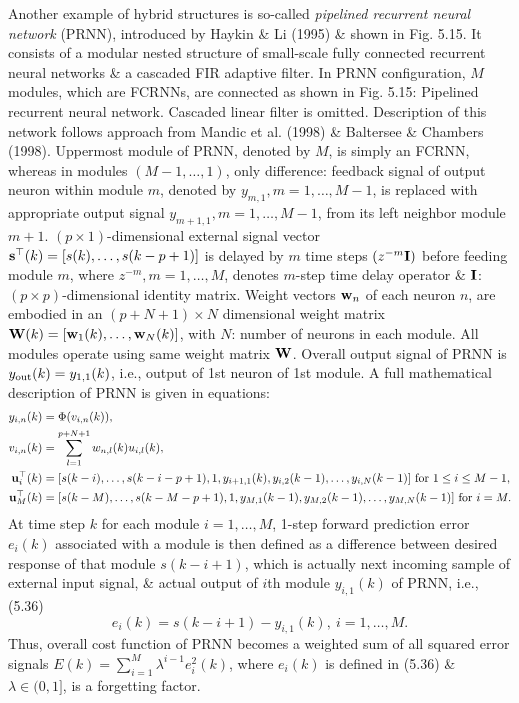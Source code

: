 \documentclass{article}
\begin{document}
\begin{enumerate}
\begin{itemize}
\begin{itemize}
			Another example of hybrid structures is so-called {\it pipelined recurrent neural network} (PRNN), introduced by Haykin \& Li (1995) \& shown in Fig. 5.15. It consists of a modular nested structure of small-scale fully connected recurrent neural networks \& a cascaded FIR adaptive filter. In PRNN configuration, $M$ modules, which are FCRNNs, are connected as shown in {\sf Fig. 5.15: Pipelined recurrent neural network}. Cascaded linear filter is omitted. Description of this network follows approach from Mandic et al. (1998) \& Baltersee \& Chambers (1998). Uppermost module of PRNN, denoted by $M$, is simply an FCRNN, whereas in modules $(M - 1,\ldots,1)$, only difference: feedback signal of output neuron within module $m$, denoted by $y_{m,1},m = 1,\ldots,M - 1$, is replaced with appropriate output signal $y_{m+1,1},m = 1,\ldots,M - 1$, from its left neighbor module $m + 1$. $(p\times1)$-dimensional external signal vector ${\bf s}^\top(k) = [s(k),\ldots,s(k - p + 1)]$ is delayed by $m$ time steps $(z^{-m}{\bf I})$ before feeding module $m$, where $z^{-m},m = 1,\ldots,M$, denotes $m$-step time delay operator \& ${\bf I}$: $(p\times p)$-dimensional identity matrix. Weight vectors ${\bf w}_n$ of each neuron $n$, are embodied in an $(p + N + 1)\times N$ dimensional weight matrix ${\bf W}(k) = [{\bf w}_1(k),\ldots,{\bf w}_N(k)]$, with $N$: number of neurons in each module. All modules operate using same weight matrix ${\bf W}$. Overall output signal of PRNN is $y_{\rm out}(k) = y_{1,1}(k)$, i.e., output of 1st neuron of 1st module. A full mathematical description of PRNN is given in equations:
			\begin{align}
				y_{i,n}(k) &= \Phi(v_{i,n}(k)),\\
				v_{i,n}(k) &= \sum_{l=1}^{p + N + 1} w_{n,l}(k)u_{i,l}(k),\\
				{\bf u}_i^\top(k) &= [s(k - i),\ldots,s(k - i - p + 1),1,y_{i+1,1}(k),y_{i,2}(k - 1),\ldots,y_{i,N}(k - 1)]\mbox{ for } 1\le i\le M - 1,\\
				{\bf u}_M^\top(k) &= [s(k - M),\ldots,s(k - M - p + 1),1,y_{M,1}(k - 1),y_{M,2}(k - 1),\ldots,y_{M,N}(k - 1)]\mbox{ for } i = M.
			\end{align}
			At time step $k$ for each module $i = 1,\ldots,M$, 1-step forward prediction error $e_i(k)$ associated with a module is then defined as a difference between desired response of that module $s(k - i + 1)$, which is actually next incoming sample of external input signal, \& actual output of $i$th module $y_{i,1}(k)$ of PRNN, i.e., (5.36)
			\begin{equation}
				e_i(k) = s(k - i + 1) - y_{i,1}(k),\ i = 1,\ldots,M.
			\end{equation}
			Thus, overall cost function of PRNN becomes a weighted sum of all squared error signals $E(k) = \sum_{i=1}^M \lambda^{i-1}e_i^2(k)$, where $e_i(k)$ is defined in (5.36) \& $\lambda\in(0,1]$, is a forgetting factor.
			

\end{itemize}
\end{itemize}
\end{enumerate}
\end{document}
